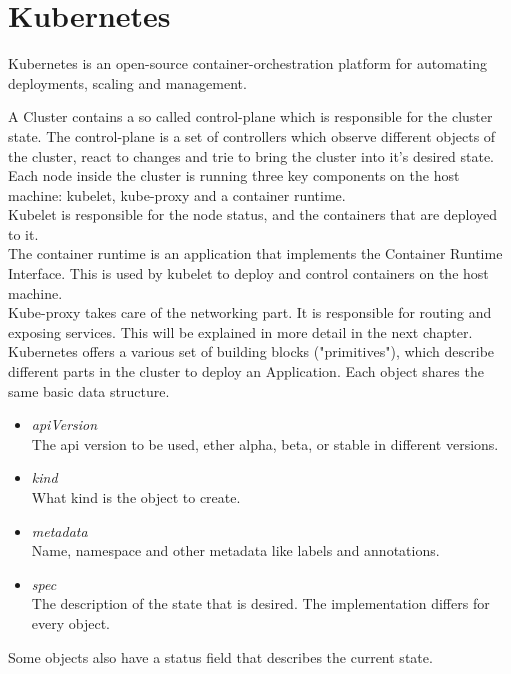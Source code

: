 \section{Kubernetes}

Kubernetes is an open-source container-orchestration platform for automating deployments, scaling and management.

A Cluster contains a so called control-plane which is responsible for the cluster state.
The control-plane is a set of controllers which observe different objects of the cluster, react to changes and trie to bring the cluster into it's desired state.
\\
Each node inside the cluster is running three key components on the host machine: kubelet, kube-proxy and a container runtime.
\\
Kubelet is responsible for the node status, and the containers that are deployed to it.
\\
The container runtime is an application that implements the Container Runtime Interface.
This is used by kubelet to deploy and control containers on the host machine.
\\
Kube-proxy takes care of the networking part.
It is responsible for routing and exposing services.
This will be explained in more detail in the next chapter.
\\
\newpage
Kubernetes offers a various set of building blocks ("primitives"), which describe different parts in the cluster to deploy an Application.
Each object shares the same basic data structure.

\begin{itemize}
    \item \textit{apiVersion} \\
    The api version to be used, ether alpha, beta, or stable in different versions.
    \item \textit{kind} \\
    What kind is the object to create.
    \item \textit{metadata} \\
    Name, namespace and other metadata like labels and annotations.
    \item \textit{spec} \\
    The description of the state that is desired.
    The implementation differs for every object.
\end{itemize}

Some objects also have a status field that describes the current state.

